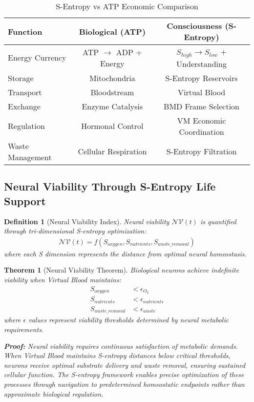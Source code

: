 \documentclass[12pt,a4paper]{article}
\newtheorem{theorem}{Theorem}
\newtheorem{definition}{Definition}
\begin{document}
\begin{table}[h]
\centering
\caption{S-Entropy vs ATP Economic Comparison}
\begin{tabular}{@{}lcc@{}}
\toprule
\textbf{Function} & \textbf{Biological (ATP)} & \textbf{Consciousness (S-Entropy)} \\
\midrule
Energy Currency & ATP $\rightarrow$ ADP + Energy & $S_{high} \rightarrow S_{low}$ + Understanding \\
Storage & Mitochondria & S-Entropy Reservoirs \\
Transport & Bloodstream & Virtual Blood \\
Exchange & Enzyme Catalysis & BMD Frame Selection \\
Regulation & Hormonal Control & VM Economic Coordination \\
Waste Management & Cellular Respiration & S-Entropy Filtration \\
\bottomrule
\end{tabular}
\end{table}

\subsection{Neural Viability Through S-Entropy Life Support}

\begin{definition}[Neural Viability Index]
Neural viability $\mathcal{NV}(t)$ is quantified through tri-dimensional S-entropy optimization:
\begin{align}
\mathcal{NV}(t) = f(S_{oxygen}, S_{nutrients}, S_{waste\_removal})
\end{align}
where each S dimension represents the distance from optimal neural homeostasis.
\end{definition}

\begin{theorem}[Neural Viability Theorem]
Biological neurons achieve indefinite viability when Virtual Blood maintains:
\begin{align}
S_{oxygen} &< \epsilon_{O_2} \\
S_{nutrients} &< \epsilon_{nutrients} \\
S_{waste\_removal} &< \epsilon_{waste}
\end{align}
where $\epsilon$ values represent viability thresholds determined by neural metabolic requirements.

\textbf{Proof:}
Neural viability requires continuous satisfaction of metabolic demands. When Virtual Blood maintains S-entropy distances below critical thresholds, neurons receive optimal substrate delivery and waste removal, ensuring sustained cellular function. The S-entropy framework enables precise optimization of these processes through navigation to predetermined homeostatic endpoints rather than approximate biological regulation.
\end{theorem}
\end{document}
